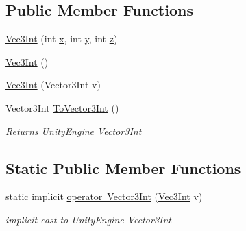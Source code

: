 \subsection*{Public Member Functions}
\begin{DoxyCompactItemize}
\item 
\mbox{\hyperlink{class_virt_muse_web_1_1_utility_1_1_vec3_int_a620fcd4f2b087423da48dbce79de16c3}{Vec3\+Int}} (int \mbox{\hyperlink{class_virt_muse_web_1_1_utility_1_1_vec3_int_ad791a2661c4cada2c65b3e5843b7b95a}{x}}, int \mbox{\hyperlink{class_virt_muse_web_1_1_utility_1_1_vec3_int_a99269d662acd975060395ea79b5a673c}{y}}, int \mbox{\hyperlink{class_virt_muse_web_1_1_utility_1_1_vec3_int_a4e6192905bc3fc945ac608f334ef0475}{z}})
\item 
\mbox{\hyperlink{class_virt_muse_web_1_1_utility_1_1_vec3_int_a1c89cba03c2b4dc4049239fada67c509}{Vec3\+Int}} ()
\item 
\mbox{\hyperlink{class_virt_muse_web_1_1_utility_1_1_vec3_int_ab5e7f0bb6ac1c19ac8d62f49ad2acea4}{Vec3\+Int}} (Vector3\+Int v)
\item 
Vector3\+Int \mbox{\hyperlink{class_virt_muse_web_1_1_utility_1_1_vec3_int_a826b51cbef73c8623c7e060d3ae9c7f8}{To\+Vector3\+Int}} ()
\begin{DoxyCompactList}\small\item\em Returns Unity\+Engine Vector3\+Int \end{DoxyCompactList}\end{DoxyCompactItemize}
\subsection*{Static Public Member Functions}
\begin{DoxyCompactItemize}
\item 
static implicit \mbox{\hyperlink{class_virt_muse_web_1_1_utility_1_1_vec3_int_a2d02ca8e5970fa9d535b83c6aa18e71c}{operator Vector3\+Int}} (\mbox{\hyperlink{class_virt_muse_web_1_1_utility_1_1_vec3_int}{Vec3\+Int}} v)
\begin{DoxyCompactList}\small\item\em implicit cast to Unity\+Engine Vector3\+Int \end{DoxyCompactList}\end{DoxyCompactItemize}
